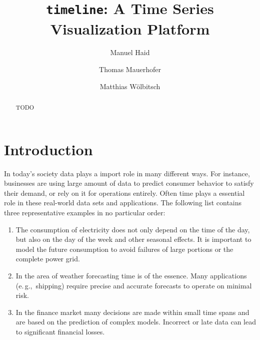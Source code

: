 \documentclass[runningheads,a4paper,11pt]{llncs}
\newcommand{\eg}{e.\,g.,\ }
\begin{document}


\title{\texttt{timeline}: A Time Series Visualization Platform}
\author{Manuel Haid \and Thomas Mauerhofer \and Matthias W\"olbitsch}

\maketitle

\begin{abstract}
TODO
\end{abstract}


\section{Introduction}\label{sec:intro}

In today's society data plays a import role in many different ways.
For instance, businesses are using large amount of data to predict consumer behavior to satisfy their demand, or rely on it for operations entirely.
Often time plays a essential role in these real-world data sets and applications. 
The following list contains three representative examples in no particular order:

\begin{enumerate}
 \item The consumption of electricity does not only depend on the time of the day, but also on the day of the week and other seasonal effects.
 It is important to model the future consumption to avoid failures of large portions or the complete power grid.
 
 \item In the area of weather forecasting time is of the essence. 
 Many applications (\eg shipping) require precise and accurate forecasts to operate on minimal risk.
 
 \item In the finance market many decisions are made within small time spans and are based on the prediction of complex models.
 Incorrect or late data can lead to significant financial losses.
\end{enumerate}
\end{document}
